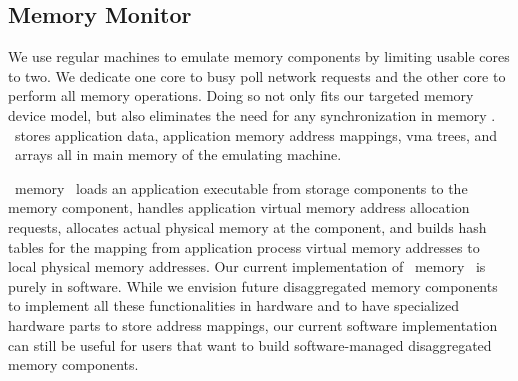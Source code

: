 \documentclass[10pt,times,twocolumn]{z2-article}
\begin{document}
{{{{{{{\subsection{Memory Monitor}
\label{sec:memimpl}

We use regular machines to emulate memory components 
by limiting usable cores to two. %
We dedicate one core to busy poll network requests 
and the other core to perform all memory operations. 
Doing so not only fits our targeted memory device model,
but also eliminates the need for any synchronization in memory \microos.
\lego\ stores 
application data, application memory address mappings, vma trees, and \vregion\ arrays all
in main memory of the emulating machine. 

\lego\ memory \microos\ loads an application executable from storage components 
to the memory component, handles application virtual memory address allocation requests,
allocates actual physical memory at the component,
and builds hash tables for the mapping from application process virtual memory addresses to 
local physical memory addresses.
Our current implementation of \lego\ memory \microos\ is purely in software.
While we envision future disaggregated memory components to implement all these functionalities in hardware and
to have specialized hardware parts to store address mappings,
our current software implementation can still be useful for 
users that want to build software-managed disaggregated memory components.


}}}}}}}
\end{document}
